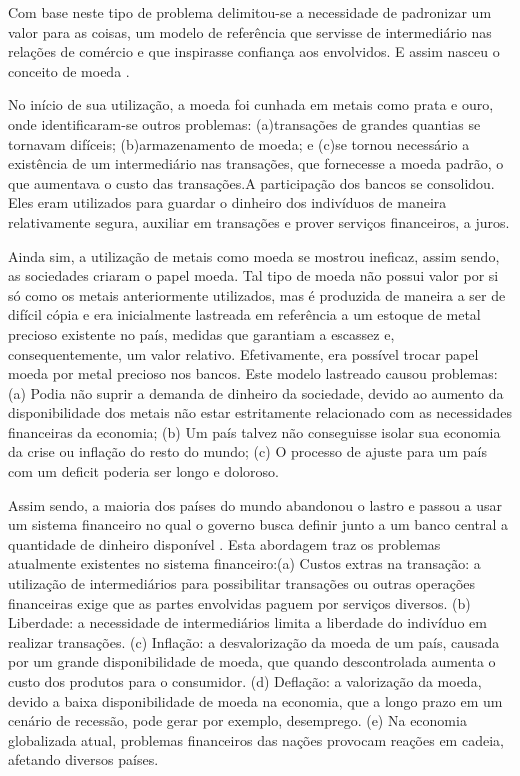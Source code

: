 \documentclass[
	article,			%
	11pt,				%
	oneside,			%
	a4paper,			%
	chapter=TITLE,		%
	section=TITLE,		%
	subsection=TITLE,	%
	subsubsection=TITLE, %
	english,			%
	brazil,				%
	sumario=tradicional
	]{ifrs-artigo-abntex2}
\begin{document}
Com base neste tipo de problema delimitou-se a necessidade de padronizar  um valor para as coisas, um modelo de referência que servisse de intermediário nas relações de comércio e que inspirasse confiança aos envolvidos. E assim nasceu o conceito de moeda \cite{britannica2018}.

No início de sua utilização, a moeda foi cunhada em metais como prata e ouro, onde identificaram-se outros problemas: (a)transações de grandes quantias se tornavam difíceis; (b)armazenamento de moeda; e (c)se tornou necessário a existência de um intermediário nas transações, que fornecesse a moeda padrão, o que aumentava o custo das transações.A participação dos bancos se consolidou. Eles eram utilizados para guardar o dinheiro dos indivíduos de maneira relativamente segura, auxiliar em transações e prover serviços financeiros, a juros.

Ainda sim, a utilização de metais como moeda se mostrou ineficaz, assim sendo, as sociedades criaram o papel moeda. Tal tipo de moeda não possui valor por si só como os metais anteriormente utilizados, mas é produzida de maneira  a ser de difícil cópia e era inicialmente lastreada em referência a um estoque de metal precioso existente no país, medidas que garantiam a escassez e, consequentemente, um valor relativo. Efetivamente, era possível trocar papel moeda por metal precioso nos bancos. Este modelo lastreado causou problemas: (a) Podia não suprir a demanda de dinheiro da sociedade, devido ao aumento da disponibilidade dos metais não estar estritamente relacionado com as necessidades financeiras da economia; (b) Um país talvez não conseguisse isolar sua economia da crise ou inflação do resto do mundo; (c) O processo de ajuste para um país com um deficit poderia ser longo e doloroso.

Assim sendo, a maioria dos países do mundo abandonou o lastro e passou a usar um sistema financeiro no qual o governo busca definir junto a um banco central a quantidade de dinheiro disponível \cite{rothbard1995}. Esta abordagem traz os problemas atualmente existentes no sistema financeiro:(a) Custos extras na transação: a utilização de intermediários para possibilitar transações ou outras operações financeiras exige que as partes envolvidas paguem por serviços diversos. (b) Liberdade: a necessidade de intermediários limita a liberdade do indivíduo em realizar transações. (c) Inflação: a desvalorização da moeda de um país, causada por um grande disponibilidade de moeda, que quando descontrolada aumenta o custo dos produtos para o consumidor. (d) Deflação: a valorização da moeda, devido a baixa disponibilidade de moeda na economia, que a longo prazo em um cenário de recessão, pode gerar por exemplo, desemprego. (e) Na economia globalizada atual, problemas financeiros das nações provocam reações em cadeia, afetando diversos países.
\end{document}
